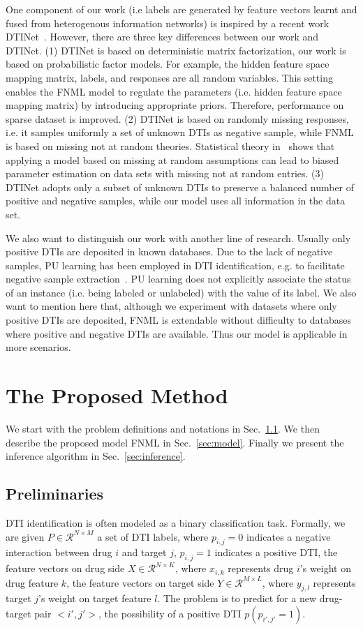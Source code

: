 \documentclass[conference]{IEEEtran}
\begin{document}
One component of our work (i.e labels are generated by feature vectors learnt and fused from heterogenous information networks) is inspired by a recent work DTINet~\cite{Luo2017Network}. However, there are three key differences between our work and DTINet. (1) DTINet is based on deterministic matrix factorization, our work is based on probabilistic factor models. For example, the hidden feature space mapping matrix, labels, and responses are all random variables. This setting enables the FNML model to regulate the parameters (i.e. hidden feature space mapping matrix) by introducing appropriate priors. Therefore, performance on sparse dataset is improved. (2) DTINet is based on randomly missing responses, i.e. it samples uniformly a set of unknown DTIs as negative sample, while FNML is based on missing not at random theories. Statistical theory in~\cite{Little1987Statistical} shows that applying a model based on missing at random assumptions can lead to biased parameter estimation on data sets with missing not at random entries. (3) DTINet adopts only a subset of unknown DTIs to preserve a balanced number of positive and negative samples, while our model uses all information in the data set.

We also want to distinguish our work with another line of research. Usually only positive DTIs are deposited in known databases. Due to the lack of negative samples, PU learning has been employed in DTI identification, e.g. to facilitate negative sample extraction~\cite{Peng2017Screening}. PU learning does not explicitly associate the status of an instance (i.e. being labeled or unlabeled) with the value of its label. We also want to mention here that, although we experiment with datasets where only positive DTIs are deposited, FNML is extendable without difficulty to databases where positive and negative DTIs are available. Thus our model is applicable in more scenarios.


\section{The Proposed Method}\label{sec:method}
We start with the problem definitions and notations in Sec.~\ref{sec:input}. We then describe the proposed model FNML in Sec.~\ref{sec:model}. Finally we present the inference algorithm in Sec.~\ref{sec:inference}.

\subsection{Preliminaries}\label{sec:input}
DTI identification is often modeled as a binary classification task. Formally, we are given $P\in \mathcal{R}^{N\times M}$ a set of DTI labels, where $p_{i,j}=0$ indicates a negative interaction between drug $i$ and target $j$, $p_{i,j}=1$ indicates a positive DTI, the feature vectors on drug side $X\in \mathcal{R}^{N \times K}$, where $x_{i,k}$ represents drug $i$'s weight on drug feature $k$, the feature vectors on target side $Y\in \mathcal{R}^{M \times L}$, where $y_{j,l}$ represents target $j$'s weight on target feature $l$. The problem is to predict for a new drug-target pair $<i',j'>$, the possibility of a positive DTI $p(p_{i',j'}=1)$.
\end{document}

